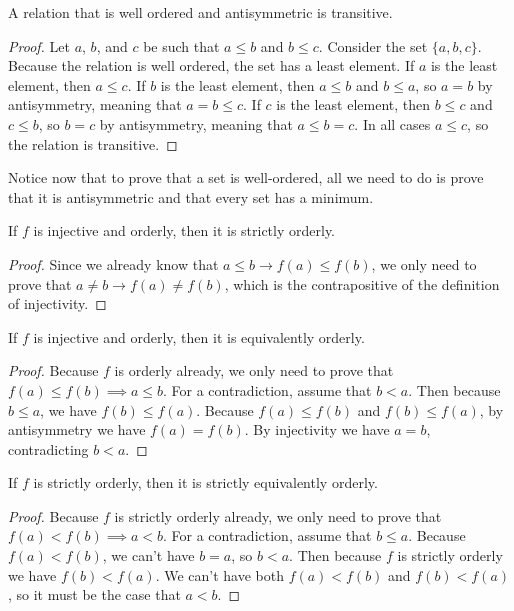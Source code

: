 \documentclass[../../math.tex]{subfiles}
\begin{document}
\begin{instance} \label{wo_trans}
    A relation that is well ordered and antisymmetric is transitive.
\end{instance}
\begin{proof}
    Let $a$, $b$, and $c$ be such that $a \leq b$ and $b \leq c$.  Consider the
    set $\{a, b, c\}$.  Because the relation is well ordered, the set has a
    least element.  If $a$ is the least element, then $a \leq c$.  If $b$ is the
    least element, then $a \leq b$ and $b \leq a$, so $a = b$ by antisymmetry,
    meaning that $a = b \leq c$.  If $c$ is the least element, then $b \leq c$
    and $c \leq b$, so $b = c$ by antisymmetry, meaning that $a \leq b = c$.  In
    all cases $a \leq c$, so the relation is transitive.
\end{proof}

Notice now that to prove that a set is well-ordered, all we need to do is prove
that it is antisymmetric and that every set has a minimum.

\begin{instance} \label{homo_le_lt}
    If $f$ is injective and orderly, then it is strictly orderly.
\end{instance}
\begin{proof}
    Since we already know that $a \leq b \rightarrow f(a) \leq f(b)$, we only
    need to prove that $a \neq b \rightarrow f(a) \neq f(b)$, which is the
    contrapositive of the definition of injectivity.
\end{proof}

\begin{instance} \label{homo_le_le2}
    If $f$ is injective and orderly, then it is equivalently orderly.
\end{instance}
\begin{proof}
    Because $f$ is orderly already, we only need to prove that $f(a) \leq f(b)
    \implies a \leq b$.  For a contradiction, assume that $b < a$.  Then because
    $b \leq a$, we have $f(b) \leq f(a)$.  Because $f(a) \leq f(b)$ and $f(b)
    \leq f(a)$, by antisymmetry we have $f(a) = f(b)$.  By injectivity we have
    $a = b$, contradicting $b < a$.
\end{proof}

\begin{instance} \label{homo_lt_lt2}
    If $f$ is strictly orderly, then it is strictly equivalently orderly.
\end{instance}
\begin{proof}
    Because $f$ is strictly orderly already, we only need to prove that $f(a) <
    f(b) \implies a < b$.  For a contradiction, assume that $b \leq a$.  Because
    $f(a) < f(b)$, we can't have $b = a$, so $b < a$.  Then because $f$ is
    strictly orderly we have $f(b) < f(a)$.  We can't have both $f(a) < f(b)$
    and $f(b) < f(a)$, so it must be the case that $a < b$.
\end{proof}
\end{document}

